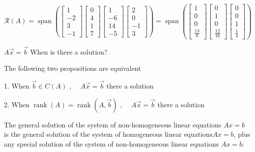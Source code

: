 \documentclass[english,onecolumn]{IEEEtran}
\begin{document}
\begin{enumerate}
$
\mathcal{R}(A)=\operatorname{span}\left(\left[\begin{array}{l}
	1\\
-2\\
3\\
-1 
\end{array}\right]\left[\begin{array}{l}
	0\\
4\\
1\\
7 
\end{array}\right]\left[\begin{array}{l}
	1\\
-6\\
14\\
-5 
\end{array}\right]\left[\begin{array}{l}
	2\\
0\\
-1\\
3 
\end{array}\right]\right)=
\operatorname{span}\left(\left[\begin{array}{l}
	1\\
0\\
0\\
\frac{13}{8}
\end{array}\right]\left[\begin{array}{l}
	0\\
1\\
0\\
\frac{12}{16} 
\end{array}\right]\left[\begin{array}{l}
0\\
0\\
1\\
\frac{1}{4}
\end{array}\right]\right)
$

$A \vec{x}=\vec{b}$ When is there a solution?

The following two propositions are equivalent

1. When $\vec{b} \in C(A)$ , $\quad A \vec{x}=\vec{b}$ there a solution

2. When ${\operatorname{rank}}(A)=\operatorname{rank}(A, \vec{b})$ , $\quad A \vec{x}=\vec{b}$ there a solution

The general solution of the system of non-homogeneous linear equations $Ax=b$ is the general solution of the system of homogeneous linear equations$Ax=b$, plus any special solution of the system of non-homogeneous linear equations $Ax=b$:


\end{enumerate}
\end{document}
